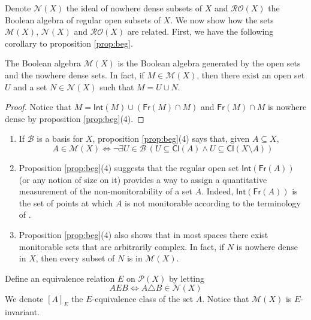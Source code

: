 \documentclass{lmcs}
\newcommand{\Cl}[1]{\mathsf{Cl}(#1)}
\newcommand{\Int}[1]{\mathsf{Int}(#1)}
\newcommand{\Fr}[1]{\mathsf{Fr}(#1)}
\begin{document}
Denote $ \mathcal N (X)$ the ideal of nowhere dense subsets of $X$ and $ \mathcal R \mathcal O (X)$ the Boolean algebra of regular open subsets of $X$. 
We now show how the sets $\mathcal{M}(X)$, $\mathcal{N}(X)$ and $\mathcal{R} \mathcal O (X)$ are related. 
% 
First, we have the following corollary to proposition \ref{prop:beg}. 

\begin{cor} \label{02072025}
The Boolean algebra $ \mathcal M (X)$ is the Boolean algebra generated by the open sets and the nowhere dense sets.
In fact, if $M\in \mathcal M (X)$, then there exist an open set $U$ and a set $N\in \mathcal N (X)$ such that $M=U\cup N$.
\end{cor}

\begin{proof}
Notice that $M= \Int{M} \cup ( \Fr{M} \cap M)$ and $ \Fr{M} \cap M$ is nowhere dense by proposition \ref{prop:beg}(4).
\end{proof}

\begin{rem}
\begin{enumerate}
\item If $ \mathcal B $ is a basis for $X$, proposition \ref{prop:beg}(4) says that, given $A\subseteq X$,
\begin{equation} \label{eq:charact}
A\in \mathcal M (X)\Leftrightarrow\neg\exists U\in \mathcal B \ (U\subseteq \Cl{A} \land U\subseteq \Cl{X\setminus A} )
\end{equation}
\item Proposition \ref{prop:beg}(4) suggests that the regular open set $ \Int{ \Fr{A} }$ (or any notion of size on it) provides a way to assign a quantitative measurement of the non-monitorability of a set $A$.
Indeed, $ \Int{\Fr{A} } $ is the set of points at which $A$ is not monitorable according to the terminology of \cite[definition 2(1) and proposition 3]{dieker2014}.
\item Proposition \ref{prop:beg}(4) also shows that in most spaces there exist monitorable sets that are arbitrarily complex.
In fact, if $N$ is nowhere dense in $X$, then every subset of $N$ is in $ \mathcal M (X)$.
\end{enumerate}
\end{rem}

Define an equivalence relation $E$ on $ \mathcal P (X)$ by letting
\[
AEB\Leftrightarrow A\triangle B\in \mathcal N (X)
\]
We denote $[A]_E$ the $E$-equivalence class of the set $A$.
Notice that $ \mathcal M (X)$ is $E$-invariant.
\end{document}
